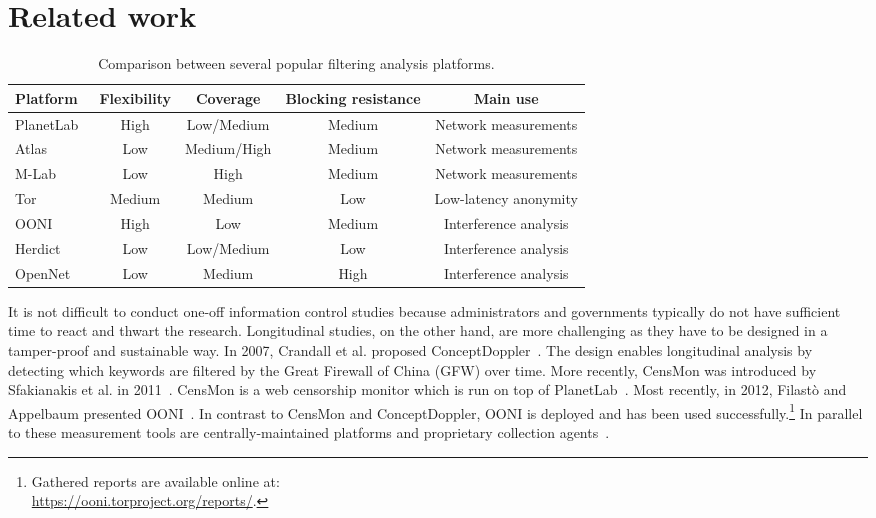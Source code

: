 \section{Related work}
\label{related_work}
\begin{table*}[ht!]
\centering
\begin{tabular}{l|cccc}
\textbf{Platform} & \textbf{Flexibility} & \textbf{Coverage} &
\textbf{Blocking resistance} & \textbf{Main use} \\
\hline 
PlanetLab~\cite{planetlab} & High & Low/Medium & Medium & Network measurements \\
Atlas~\cite{atlas} & Low & Medium/High & Medium & Network measurements \\
M-Lab~\cite{dovrolis2010measurement} & Low & High & Medium & Network measurements \\
Tor~\cite{Dingledine2004} & Medium & Medium & Low & Low-latency anonymity \\
OONI~\cite{Filasto2012} & High & Low & Medium & Interference analysis \\
Herdict~\cite{Herdict} & Low & Low/Medium & Low & Interference analysis \\
OpenNet~\cite{opennet} & Low & Medium & High & Interference analysis \\
\hline 
\end{tabular} 
\caption{Comparison between several popular filtering analysis platforms.}
\label{tab:comparison}
\end{table*}

It is not difficult to conduct one-off information control studies because administrators and governments
typically do not have sufficient time to react and thwart the research.
Longitudinal studies, on the other hand, are more challenging as they have to
be designed in a tamper-proof and sustainable way.  In 2007, Crandall et al.
proposed ConceptDoppler~\cite{Crandall2007}.  The design enables longitudinal 
analysis by detecting which keywords are filtered by the Great
Firewall of China (GFW) over time.  More recently, CensMon was introduced by
Sfakianakis et al. in 2011~\cite{Sfakianakis2011}.  CensMon is a web censorship
monitor which is run on top of PlanetLab~\cite{planetlab}.  Most recently, in
2012, Filast\`{o} and Appelbaum presented OONI~\cite{Filasto2012}.  In
contrast to CensMon and ConceptDoppler, OONI is deployed and has been used
successfully.\footnote{Gathered reports are available online at:\\
\url{https://ooni.torproject.org/reports/}.}  In parallel to these measurement tools 
are centrally-maintained platforms and proprietary collection agents~\cite{hwang2007herdict,opennet}.

